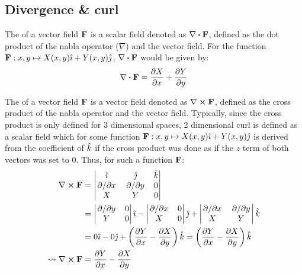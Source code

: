 \subsection{Divergence \& curl}
\begin{defn}
	The  of a vector field $\mathbf{F}$ is a scalar field denoted as $\divergence{\fatf}$, defined as the dot product
	of the nabla operator ($\nabla$) and the vector field. For the function $\mathbf{F}:x,y\mapsto X(x,y)\hat{\imath}+Y(x,y)\hat{\jmath}$, $\divergence{\fatf}$
	would be given by:
	$$
		\divergence{\fatf}=\pdv{X}{x}+\pdv{Y}{y}
	$$
\end{defn}
\begin{defn}
	The  of a vector field $\mathbf{F}$ is a vector field denoted as $\curl{\fatf}$, defined as the cross product of the
	nabla operator and the vector field. Typically, since the cross product is only defined for 3 dimensional spaces, 2 dimensional curl is defined
	as a scalar field which for some function $\mathbf{F}:x,y\mapsto X(x,y)\hat{\imath}+Y(x,y)\hat{\jmath}$ is derived from the coefficient of $\hat{k}$ if the cross
	product was done as if the $z$ term of both vectors was set to 0. Thus, for such a function $\mathbf{F}$:
	\begin{align*}
		\curl{\fatf}&=\begin{vmatrix}
			\ihat&\jhat&\khat\\
			\pdv*{x}&\pdv*{y}&0\\
			X&Y&0
		\end{vmatrix}\\
		&=\begin{vmatrix}
			\pdv*{y}&0\\
			Y&0
		\end{vmatrix}\ihat
		-\begin{vmatrix}
			\pdv*{x}&0\\
			X&0
		\end{vmatrix}\jhat
		+\begin{vmatrix}
			\pdv*{x}&\pdv*{y}\\
			X&Y
		\end{vmatrix}\khat\\
		&=0\ihat-0\jhat+\left(\pdv{Y}{x}-\pdv{X}{y}\right)\khat=\left(\pdv{Y}{x}-\pdv{X}{y}\right)\khat\\
		\leadsto\curl{\fatf}&=\pdv{Y}{x}-\pdv{X}{y}
	\end{align*}
\end{defn}